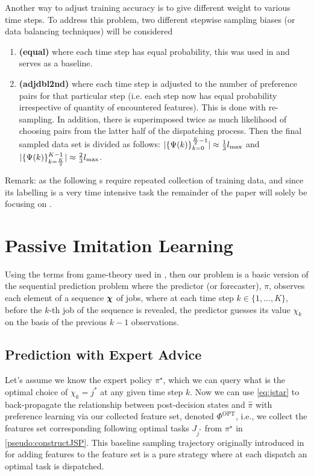 \documentclass[twocolumn]{svjour3}
\begin{document}
Another way to adjust training accuracy is to give different weight to various 
time steps. To address this problem, two different stepwise sampling biases (or 
data balancing techniques) will be considered
\begin{enumerate}[after={{}}, leftmargin=*,
label={\textbf{Bias.\arabic*}}, ref={{Bias.\arabic*}}]
\item \label{bias:equal} \textbf{(equal)} where each time step has equal 
probability, this was used in \cite{InRu14,InRu15a} and serves as a baseline.
\item \label{bias:adjdbl2nd} \textbf{(adjdbl2nd)} where each time step is 
adjusted to the number of preference pairs for that particular step (i.e. 
each step now has equal probability irrespective of quantity of encountered 
features). This is done with re-sampling.
In addition, there is superimposed twice as much likelihood of 
choosing pairs from the latter half of the dispatching process. Then the 
final sampled data set is divided as follows:
$\lvert\{\Psi(k)\}_{k=0}^{\frac{K}{2}-1}\rvert \approx \frac{1}{3}l_{\max}$ and 
$\lvert\{\Psi(k)\}_{k=\frac{K}{2}}^{K-1}\rvert \approx \frac{2}{3}l_{\max}$.
\end{enumerate}

\noindent Remark: as the following s require 
repeated collection of training data, and since its labelling is a very 
time intensive task the remainder of the paper will solely be focusing 
on .

\section{Passive Imitation Learning}\label{sec:il:passive}
Using the terms from game-theory used in \cite{CesaBianchi06}, %
then our problem is a basic version of the sequential prediction problem where 
the predictor (or forecaster), $\pi$, observes each element of a sequence 
$\bm \chi$ of jobs, where at each time step $k \in \{1,...,K\}$, before the 
$k$-th job of the sequence is revealed, the predictor guesses its value 
$\chi_k$ on the basis of the previous $k-1$ observations. 

\subsection{Prediction with Expert Advice}\label{sec:expertPolicy}
Let's assume we know the expert policy $\pi^\star$, which we can query what 
is the optimal choice of $\chi_k={j^*}$ at any given time step $k$. 
Now we can use \cref{eq:jstar} to back-propagate the relationship between 
post-decision states and $\hat{\pi}$ with preference learning via our collected 
feature set, denoted $\Phi^\text{OPT}$, i.e., we collect the features set 
corresponding following optimal tasks $J_{j^*}$ from $\pi^\star$ in 
\cref{pseudo:constructJSP}.
This baseline sampling trajectory originally introduced in \cite{InRu11a} for 
adding features to the feature set is a pure strategy where at each dispatch an 
optimal task is dispatched.
\end{document}
